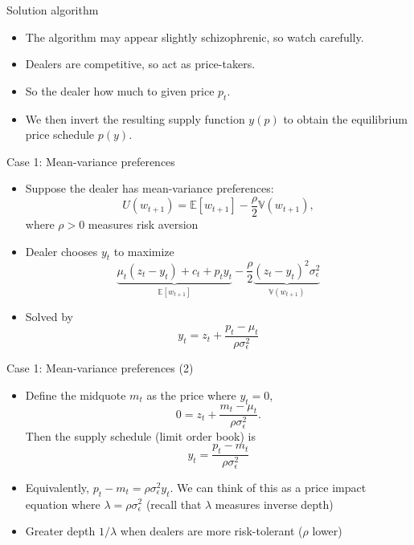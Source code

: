 \documentclass[english,10pt
,aspectratio=169
]{beamer}
\begin{document}
\begin{frame}{Solution algorithm}
	\begin{itemize}
		\item The algorithm may appear slightly schizophrenic, so watch carefully.
		\item Dealers are competitive, so act as price-takers.
		\item So the dealer  how much to  \alert{given price $p_t$}.
		\item We then invert the resulting supply function $y(p)$ to obtain the equilibrium price schedule $p(y)$.
	\end{itemize}
\end{frame}


\begin{frame}{Case 1: Mean-variance preferences}
	\begin{itemize}
		\item Suppose the dealer has mean-variance preferences:
		\[
		U(w_{t+1})=\mathbb{E}[w_{t+1}] - \frac{\rho}{2} \mathbb{V}(w_{t+1}),
		\]
		where $\rho>0$ measures risk aversion
		\item Dealer chooses $y_t$ to maximize
		\[
		\underbrace{\mu_t(z_t-y_t) + c_t + p_t y_t}_{\mathbb{E}[w_{t+1}] } - \frac{\rho}{2} \underbrace{(z_t -y_t)^2 \sigma^2_\epsilon}_{ \mathbb{V}(w_{t+1})}
		\]
		\item Solved by 
			\[
			y_t = z_t + \frac{p_t-\mu_t}{\rho \sigma^2_\epsilon}
			\]
	\end{itemize}
\end{frame}


\begin{frame}{Case 1: Mean-variance preferences (2)}
	\begin{itemize}
		\item Define the midquote $m_t$ as the price where $y_t=0$,
		\[
		0 = z_t + \frac{m_t-\mu_t}{\rho \sigma^2_\epsilon}.
		\]
		Then the supply schedule (limit order book) is 
		\[
		y_t = \frac{p_t - m_t}{\rho \sigma^2_\epsilon}
		\]
		\item Equivalently, $p_t-m_t=\rho \sigma^2_\epsilon y_t$. We can think of this as a price impact equation where $\lambda=\rho \sigma^2_\epsilon$ (recall that $\lambda$ measures inverse depth)
		\item Greater depth $1/\lambda$ when dealers are more risk-tolerant ($\rho$ lower)
	\end{itemize}
\end{frame}
\end{document}
